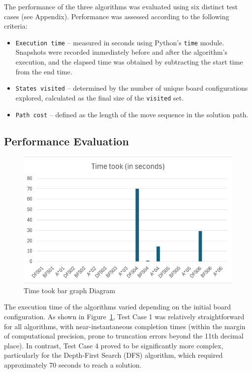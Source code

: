\documentclass[journal]{./IEEE/IEEEtran}
\begin{document}
The performance of the three algorithms was evaluated using six distinct test cases (see Appendix). 
Performance was assessed according to the following criteria:

\begin{itemize}
    \item \texttt{Execution time} – measured in seconds using Python's \texttt{time} module. Snapshots were recorded immediately before and after the algorithm’s execution, and the elapsed time was obtained by subtracting the start time from the end time.  
    \item \texttt{States visited} – determined by the number of unique board configurations explored, calculated as the final size of the \texttt{visited} set.  
    \item \texttt{Path cost} – defined as the length of the move sequence in the solution path.  
\end{itemize}

\subsection{Performance Evaluation}
\begin{figure}[H]
    \centering
    \includegraphics[width=1\linewidth]{pictures-Clarence/time took bar graph.png}
    \caption{Time took bar graph Diagram}
    \label{fig:time_bar_graph}
\end{figure}
The execution time of the algorithms varied depending on the initial board configuration. As shown in Figure~\ref{fig:time_bar_graph}, Test Case 1 was relatively straightforward for all algorithms, with near-instantaneous completion times (within the margin of computational precision, prone to truncation errors beyond the 11th decimal place). In contrast, Test Case 4 proved to be significantly more complex, particularly for the Depth-First Search (DFS) algorithm, which required approximately 70 seconds to reach a solution.  
\end{document}

